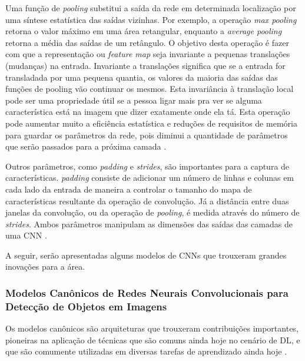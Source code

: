  Uma função de \emph{pooling} substitui a saída da rede em determinada localização por uma síntese estatística das saídas vizinhas. Por exemplo, a operação \emph{max pooling} retorna o valor máximo em uma área retangular, enquanto a \emph{average pooling} retorna a média das saídas de um retângulo. O objetivo desta operação é fazer com que a representação ou \emph{feature map} seja invariante a pequenas translações (mudanças) na entrada. Invariante a translações significa que se a entrada for transladada por uma pequena quantia, os valores da maioria das saídas das funções de pooling vão continuar os mesmos. Esta invariância à translação local pode ser uma propriedade útil se a pessoa ligar mais pra ver se alguma característica está na imagem que dizer exatamente onde ela tá. Esta operação pode aumentar muito a eficiência estatística e reduções de requisitos de memória para guardar os parâmetros da rede, pois diminui a quantidade de parâmetros que serão passados para a próxima camada \cite{goodfellow2016deep}.

 Outros parâmetros, como \emph{padding} e \emph{strides}, são importantes para a captura de características. \emph{padding} consiste de adicionar um número de linhas e colunas em cada lado da entrada de maneira a controlar o tamanho do mapa de características resultante da operação de convolução. Já a distância entre duas janelas da convolução, ou da operação de \emph{pooling}, é medida através do número de \emph{strides}. Ambos parâmetros manipulam as dimensões das saídas das camadas de uma CNN \cite{chollet2017deep}.

A seguir, serão apresentadas alguns modelos de CNNs que trouxeram grandes inovações para a área.

\subsubsection{Modelos Canônicos de Redes Neurais Convolucionais para Detecção de Objetos em Imagens} \label{subsubsec:modelos_canonicos}

Os modelos canônicos são arquiteturas que trouxeram contribuições importantes, pioneiras na aplicação de técnicas que são comuns ainda hoje no cenário de DL, e que são comumente utilizadas em diversas tarefas de aprendizado ainda hoje \cite{9dlpapers}.

